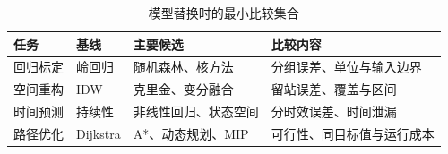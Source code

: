\begin{table}[H]\centering\caption{模型替换时的最小比较集合}
\begin{tabularx}{\linewidth}{lYYY}\toprule
任务 & 基线 & 主要候选 & 比较内容\\\midrule
回归标定 & 岭回归 & 随机森林、核方法 & 分组误差、单位与输入边界\\
空间重构 & IDW & 克里金、变分融合 & 留站误差、覆盖与区间\\
时间预测 & 持续性 & 非线性回归、状态空间 & 分时效误差、时间泄漏\\
路径优化 & Dijkstra & A*、动态规划、MIP & 可行性、同目标值与运行成本\\\bottomrule
\end{tabularx}\end{table}


